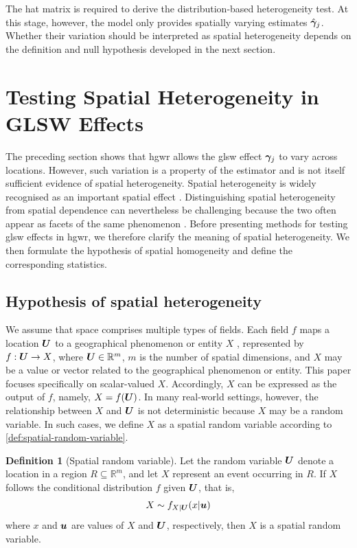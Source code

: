 \documentclass[times]{interact}
\theoremstyle{plain}%
\theoremstyle{definition}
\newtheorem{definition}[definition]{Definition}
\theoremstyle{remark}
\begin{document}
The hat matrix is required to derive the distribution-based heterogeneity test.
At this stage, however, the model only provides spatially varying estimates $\hat{\bm{\gamma}}_j$.
Whether their variation should be interpreted as spatial heterogeneity depends on the definition and null hypothesis developed in the next section.

\section{Testing Spatial Heterogeneity in GLSW Effects} \label{sec:glsw-test}

The preceding section shows that \gls{hgwr} allows the \gls{glsw} effect $\bm{\gamma}_j$ to vary across locations.
However, such variation is a property of the estimator and is not itself sufficient evidence of spatial heterogeneity.
Spatial heterogeneity is widely recognised as an important spatial effect \citep{Anselin-2010,ShuPei-2019,ComberBrunsdon-2022}.
Distinguishing spatial heterogeneity from spatial dependence can nevertheless be challenging because the two often appear as facets of the same phenomenon \citep{Anselin-2010}.
Before presenting methods for testing \gls{glsw} effects in \gls{hgwr}, we therefore clarify the meaning of spatial heterogeneity.
We then formulate the hypothesis of spatial homogeneity and define the corresponding statistics.

\subsection{Hypothesis of spatial heterogeneity}
\label{sec:spatial-heterogeneity}

We assume that space comprises multiple types of fields.
Each field $f$ maps a location $\bm{U}$ to a geographical phenomenon or entity $X$ \citep{LiuWang-2023-en,LiuYao-2020-en}, represented by $f:\bm{U}\rightarrow X$, where $\bm{U}\in\mathbb{R}^m$, $m$ is the number of spatial dimensions, and $X$ may be a value or vector related to the geographical phenomenon or entity.
This paper focuses specifically on scalar-valued $X$.
Accordingly, $X$ can be expressed as the output of $f$, namely, $X=f(\bm{U})$.
In many real-world settings, however, the relationship between $X$ and $\bm{U}$ is not deterministic because $X$ may be a random variable.
In such cases, we define $X$ as a spatial random variable according to \autoref{def:spatial-random-variable}.

\begin{definition}[Spatial random variable]
  \label{def:spatial-random-variable}
  Let the random variable $\bm{U}$ denote a location in a region $R\subseteq\mathbb{R}^m$, and let $X$ represent an event occurring in $R$.
  If $X$ follows the conditional distribution $f$ given $\bm{U}$, that is,
  \begin{equation}
    X \sim f_{X|\bm{U}}(x|\bm{u})
  \end{equation}
  where $x$ and $\bm{u}$ are values of $X$ and $\bm{U}$, respectively,
  then $X$ is a spatial random variable.
\end{definition}
\end{document}

